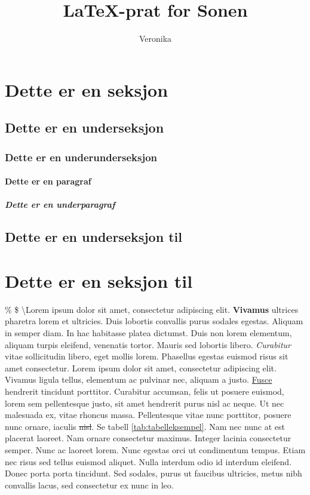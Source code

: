\documentclass[a4paper, 12pt]{article}
\title{\LaTeX{}-prat for Sonen}
\author{Veronika}
\begin{document}
\maketitle


\section{Dette er en seksjon}
\subsection{Dette er en underseksjon}
\subsubsection{Dette er en underunderseksjon}

\paragraph{Dette er en paragraf}
\subparagraph{Dette er en underparagraf}

\subsection{Dette er en underseksjon til}


\section{Dette er en seksjon til}

\newpage

\% \$ \textbackslash Lorem ipsum dolor sit amet, consectetur adipiscing elit. \textbf{Vivamus} ultrices pharetra lorem et ultricies. Duis lobortis convallis purus sodales egestas. Aliquam in semper diam. In hac habitasse platea dictumst. Duis non lorem elementum, aliquam turpis eleifend, venenatis tortor. Mauris sed lobortis libero. \textit{Curabitur} vitae sollicitudin libero, eget mollis lorem. Phasellus egestas euismod risus sit amet consectetur. Lorem ipsum dolor sit amet, consectetur adipiscing elit. Vivamus ligula tellus, elementum ac pulvinar nec, aliquam a justo. \underline{Fusce} hendrerit tincidunt porttitor. Curabitur accumsan, felis ut posuere euismod, lorem sem pellentesque justo, sit amet hendrerit purus nisl ac neque. Ut nec malesuada ex, vitae rhoncus massa. Pellentesque vitae nunc porttitor, posuere nunc ornare, iaculis \st{nisl}.
Se tabell \ref{tab:tabelleksempel}.
Nam nec nunc at est placerat laoreet. Nam ornare consectetur maximus. Integer lacinia consectetur semper. Nunc ac laoreet lorem. Nunc egestas orci ut condimentum tempus. Etiam nec risus sed tellus euismod aliquet. Nulla interdum odio id interdum eleifend. Donec porta porta tincidunt. Sed sodales, purus ut faucibus ultricies, metus nibh convallis lacus, sed consectetur ex nunc in leo.
\end{document}
